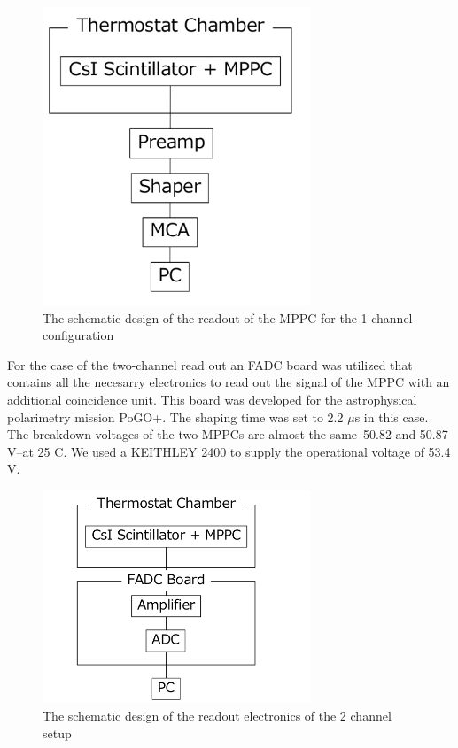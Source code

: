\documentclass[12pt, a4paper,titlepage]{article}
\numberwithin{equation}{section}
\numberwithin{figure}{section}
\begin{document}
\begin{figure}
\begin{center}
\includegraphics[width=80.0mm]{images/1channelelectronics.png}
\caption{The schematic design of the readout of the MPPC for the 1 channel configuration \cite{kento}}
\label{fig:el1ch}
\end{center}
\end{figure}

For the case of the two-channel read out an FADC board was utilized that contains all the necesarry electronics to read out the signal of the MPPC with an additional coincidence unit. This board was developed for the astrophysical polarimetry mission PoGO+. The shaping time was set to 2.2 $\mu$s in this case. The breakdown voltages of the two-MPPCs are almost the same–50.82 and 50.87 V–at 25 C. We used a KEITHLEY 2400 to supply the operational voltage of 53.4 V.

\begin{figure}[h!]
\centering
\includegraphics[width=80.0mm]{images/2channelelectronics.png}
\caption{The schematic design of the readout electronics of the 2 channel setup \cite{kento}}
\end{figure}
\end{document}
